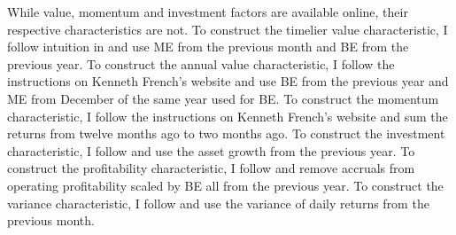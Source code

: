 While value, momentum and investment factors are available online, their
respective characteristics are not.
To construct the timelier value characteristic,
I follow intuition in \textcite{asness2013devil}
and use ME from the previous month and BE from the previous year.
To construct the annual value characteristic,
I follow the instructions on Kenneth French's website and use BE from the
previous year and ME from December of the same year used for BE.
To construct the momentum characteristic, I follow the instructions on Kenneth
French’s website and sum the returns from twelve months ago to two months ago.
To construct the investment characteristic,
I follow \textcite{fama2015five} and use the asset growth from the previous
year.
To construct the profitability characteristic, I follow
\textcite{ball2016accruals} and remove accruals from operating profitability
scaled by BE all from the previous year.
To construct the variance characteristic, I follow
\textcite{moreira2017volatility} and use the variance of daily returns from the
previous month.
